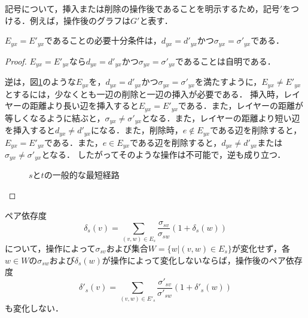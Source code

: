 記号について，挿入または削除の操作後であることを明示するため，記号$'$をつける．例えば，操作後のグラフは$G'$と表す．

\begin{lemma}
  \label{lemma:condition-of-invariability-of-shortest-path}
  $E_{yx}=E'_{yx}$であることの必要十分条件は，$d_{yx}=d'_{yx}$かつ$\sigma_{yx}=\sigma'_{yx}$である．
\end{lemma}
\begin{proof}
  $E_{yx}=E'_{yx}$なら$d_{yx}=d'_{yx}$かつ$\sigma_{yx}=\sigma'_{yx}$であることは自明である．

  逆は，図\ref{fig:proof-invariability-of-paths}のような$E_{yx}$を，$d_{yx}=d'_{yx}$かつ$\sigma_{yx}=\sigma'_{yx}$を満たすように，$E_{yx}\neq E'_{yx}$とするには，少なくとも一辺の削除と一辺の挿入が必要である．
  挿入時，レイヤーの距離より長い辺を挿入すると$E_{yx}=E'_{yx}$である．また，レイヤーの距離が等しくなるように結ぶと，$\sigma_{yx}\neq\sigma'_{yx}$となる．また，レイヤーの距離より短い辺を挿入すると$d_{yx}\neq d'_{yx}$になる．また，削除時，$e\notin E_{yx}$である辺を削除すると，$E_{yx}=E'_{yx}$である．また，$e\in E_{yx}$である辺を削除すると，$d_{yx}\neq d'_{yx}$または$\sigma_{yx}\neq\sigma'_{yx}$となる．
  したがってそのような操作は不可能で，逆も成り立つ．

  \begin{figure}
    \centering
    \def\svgwidth{.5\columnwidth}
    
    \caption{$s$と$t$の一般的な最短経路}
    \label{fig:proof-invariability-of-paths}
  \end{figure}
\end{proof}

\begin{lemma-without-proof}
  \label{lemma:condition-of-invariability-of-pairwise-dependency}
  ペア依存度
  \begin{equation}
    \label{eq:pairwise-dependency}
    \delta_s(v)=\sum_{(v,w)\in E_s}\frac{\sigma_{sv}}{\sigma_{sw}}(1+\delta_s(w))
  \end{equation}
  について，操作によって$\sigma_{sv}$および集合$W=\{w|(v,w)\in E_s\}$が変化せず，各$w\in W$の$\sigma_{sw}$および$\delta_s(w)$が操作によって変化しないならば，操作後のペア依存度
 \begin{equation}
    \label{eq:pairwise-dependency-after-update}
    \delta'_s(v)=\sum_{(v,w)\in E'_s}\frac{\sigma'_{sv}}{\sigma'_{sw}}(1+\delta'_s(w))
  \end{equation}
 も変化しない．
\end{lemma-without-proof}

